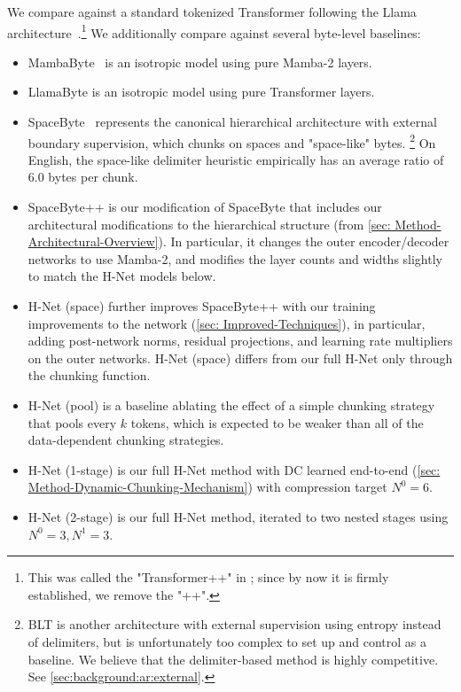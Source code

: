 We compare against a standard tokenized Transformer following the Llama architecture~\citep{Llama2,Llama3}.\footnote{This was called the "Transformer++" in \citet{Mamba}; since by now it is firmly established, we remove the "++".}
We additionally compare against several byte-level baselines:
\begin{itemize}
  \item MambaByte~\citep{MambaByte} is an isotropic model using pure Mamba-2 layers.
  \item LlamaByte is an isotropic model using pure Transformer layers.
  \item SpaceByte~\citep{SpaceByte} represents the canonical hierarchical architecture with external boundary supervision, which chunks on spaces and "space-like" bytes.
  \footnote{BLT is another architecture with external supervision using entropy instead of delimiters, but is unfortunately too complex to set up and control as a baseline. We believe that the delimiter-based method is highly competitive. See \cref{sec:background:ar:external}.}
  On English, the space-like delimiter heuristic empirically has an average ratio of $6.0$ bytes per chunk.
  \item SpaceByte++ is our modification of SpaceByte that includes our architectural modifications to the hierarchical structure (from \cref{sec: Method-Architectural-Overview}).
  In particular, it changes the outer encoder/decoder networks to use Mamba-2, and modifies the layer counts and widths slightly to match the H-Net models below.
  \item H-Net (space) further improves SpaceByte++ with our training improvements to the network (\cref{sec: Improved-Techniques}), in particular, adding post-network norms, residual projections, and learning rate multipliers on the outer networks. H-Net (space) differs from our full H-Net only through the chunking function.
  \item H-Net (pool) is a baseline ablating the effect of a simple chunking strategy that pools every $k$ tokens, which is expected to be weaker than all of the data-dependent chunking strategies.
  \item H-Net (1-stage) is our full H-Net method with DC learned end-to-end (\cref{sec: Method-Dynamic-Chunking-Mechanism}) with compression target $N^0=6$.
  \item H-Net (2-stage) is our full H-Net method, iterated to two nested stages using $N^0=3, N^1=3$.
\end{itemize}

